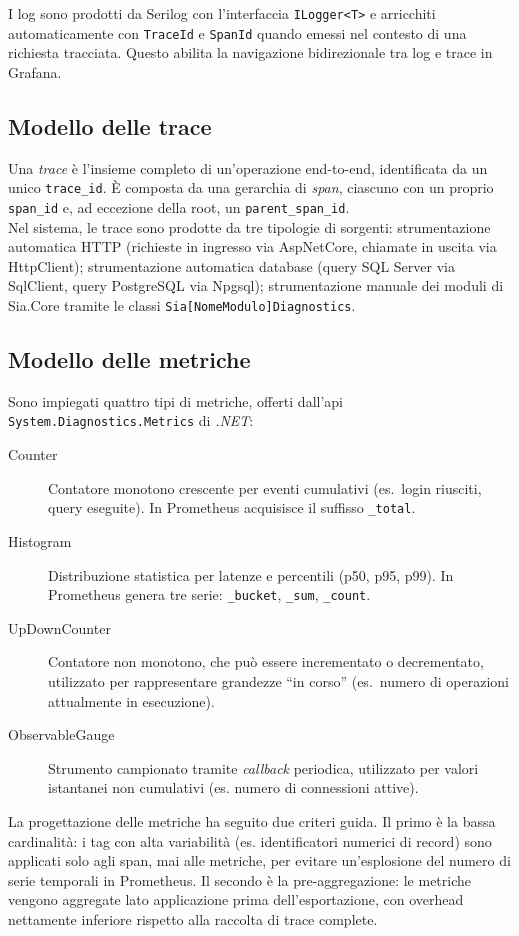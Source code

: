 I log sono prodotti da Serilog con l'interfaccia \texttt{ILogger<T>} e arricchiti
automaticamente con \texttt{TraceId} e \texttt{SpanId} quando emessi nel contesto di una
richiesta tracciata. Questo abilita la navigazione bidirezionale tra log e trace in Grafana.

\subsection{Modello delle trace}

Una \emph{trace} \`e l'insieme completo di un'operazione end-to-end, identificata da un
unico \texttt{trace\_id}. \`E composta da una gerarchia di \emph{span}, ciascuno con un
proprio \texttt{span\_id} e, ad eccezione della root, un \texttt{parent\_span\_id}.\\
Nel sistema, le trace sono prodotte da tre tipologie di sorgenti: strumentazione
automatica HTTP (richieste in ingresso via AspNetCore, chiamate in uscita via HttpClient);
strumentazione automatica database (query SQL Server via SqlClient, query PostgreSQL via
Npgsql); strumentazione manuale dei moduli di Sia.Core tramite le classi
\texttt{Sia[NomeModulo]Diagnostics}.

\subsection{Modello delle metriche}

Sono impiegati quattro tipi di metriche, offerti
dall'\gls{api} \texttt{System.Diagnostics.Metrics} di \emph{.NET}:

\begin{description}
      \item[Counter] Contatore monotono crescente per eventi cumulativi (es.\ login riusciti,
            query eseguite). In Prometheus acquisisce il suffisso \texttt{\_total}.
      \item[Histogram] Distribuzione statistica per latenze e percentili (p50, p95, p99).
            In Prometheus genera tre serie: \texttt{\_bucket}, \texttt{\_sum}, \texttt{\_count}.
      \item[UpDownCounter] Contatore non monotono, che può essere incrementato o decrementato,
            utilizzato per rappresentare grandezze ``in corso'' (es.\ numero di operazioni attualmente
            in esecuzione).
      \item[ObservableGauge] Strumento campionato tramite \emph{callback} periodica, utilizzato per
            valori istantanei non cumulativi (es. numero di connessioni
            attive).
\end{description}
La progettazione delle metriche ha seguito due criteri guida. Il primo è la bassa cardinalità:
i tag con alta variabilità (es. identificatori numerici di record) sono
applicati solo agli span, mai alle metriche, per evitare un'esplosione del numero di serie
temporali in Prometheus. Il secondo è la pre-aggregazione: le metriche vengono
aggregate lato applicazione prima dell'esportazione, con overhead nettamente inferiore
rispetto alla raccolta di trace complete.

